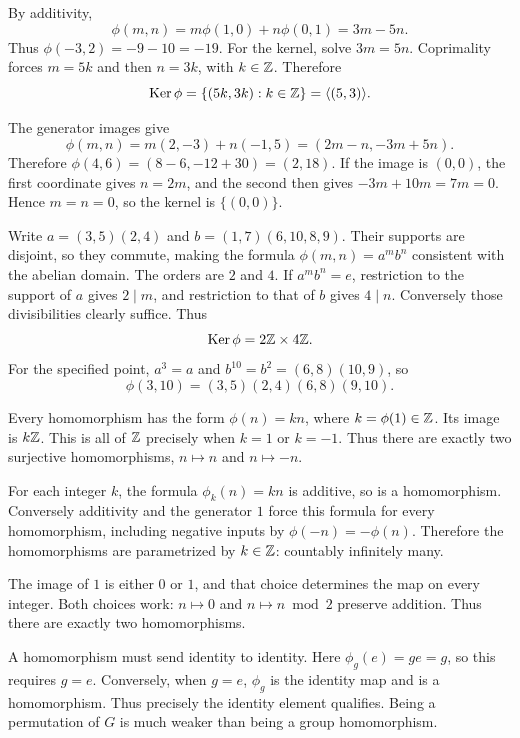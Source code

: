 By additivity,
\[\phi(m,n)=m\phi(1,0)+n\phi(0,1)=3m-5n.\]
Thus $\phi(-3,2)=-9-10=-19$. For the kernel, solve $3m=5n$. Coprimality forces $m=5k$ and then $n=3k$, with $k\in\mathbb{Z}$. Therefore
\[\operatorname{Ker}\phi=\{(5k,3k):k\in\mathbb{Z}\}=\langle (5,3)\rangle.\]

The generator images give
\[\phi(m,n)=m(2,-3)+n(-1,5)=(2m-n,-3m+5n).\]
Therefore $\phi(4,6)=(8-6,-12+30)=(2,18)$. If the image is $(0,0)$, the first coordinate gives $n=2m$, and the second then gives $-3m+10m=7m=0$. Hence $m=n=0$, so the kernel is $\{(0,0)\}$.

Write $a=(3,5)(2,4)$ and $b=(1,7)(6,10,8,9)$. Their supports are disjoint, so they commute, making the formula $\phi(m,n)=a^mb^n$ consistent with the abelian domain. The orders are $2$ and $4$.
If $a^mb^n=e$, restriction to the support of $a$ gives $2\mid m$, and restriction to that of $b$ gives $4\mid n$. Conversely those divisibilities clearly suffice. Thus
\[\operatorname{Ker}\phi=2\mathbb{Z}\times4\mathbb{Z}.\]
For the specified point, $a^3=a$ and $b^{10}=b^2=(6,8)(10,9)$, so
\[\phi(3,10)=(3,5)(2,4)(6,8)(9,10).\]

Every homomorphism has the form $\phi(n)=kn$, where $k=\phi(1)\in\mathbb{Z}$. Its image is $k\mathbb{Z}$. This is all of $\mathbb{Z}$ precisely when $k=1$ or $k=-1$. Thus there are exactly two surjective homomorphisms, $n\mapsto n$ and $n\mapsto-n$.

For each integer $k$, the formula $\phi_k(n)=kn$ is additive, so is a homomorphism. Conversely additivity and the generator $1$ force this formula for every homomorphism, including negative inputs by $\phi(-n)=-\phi(n)$. Therefore the homomorphisms are parametrized by $k\in\mathbb{Z}$: countably infinitely many.

The image of $1$ is either $0$ or $1$, and that choice determines the map on every integer. Both choices work: $n\mapsto0$ and $n\mapsto n\bmod2$ preserve addition. Thus there are exactly two homomorphisms.

A homomorphism must send identity to identity. Here $\phi_g(e)=ge=g$, so this requires $g=e$. Conversely, when $g=e$, $\phi_g$ is the identity map and is a homomorphism. Thus precisely the identity element qualifies. Being a permutation of $G$ is much weaker than being a group homomorphism.

